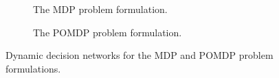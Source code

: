 \begin{figure}[t]
    \centering
    \begin{subfigure}[t]{0.49\linewidth}
        \centering
        
        \vspace*{15mm}
        \caption{The MDP problem formulation.}\label{fig:mdp_ddn}
    \end{subfigure}
    \hfill
    \begin{subfigure}[t]{0.49\linewidth}
        \centering
        
        \caption{The POMDP problem formulation.}\label{fig:pomdp_ddn}
    \end{subfigure}
    \caption{Dynamic decision networks for the MDP and POMDP problem formulations.}
    \label{fig:dnns}
\end{figure}